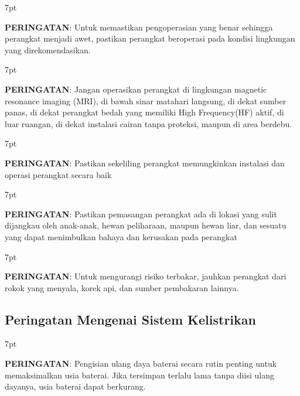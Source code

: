 \documentclass[11pt,a4paper,twoside,draft,onecolumn]{book}
\newenvironment{formalred}{%
	\def\FrameCommand{%
		\hspace{1pt}%
		{\color{red}\vrule width 2pt}%
		{\color{formalshade}\vrule width 4pt}%
		\colorbox{formalshade}%
	}%
	\MakeFramed{\advance\hsize-\width\FrameRestore}%
	\noindent\hspace{-4.55pt}%
	\begin{adjustwidth}{}{7pt}%
		\vspace{2pt}\vspace{2pt}%
	}
	{%
		\vspace{2pt}\end{adjustwidth}\endMakeFramed%
}
\begin{document}
				\begin{formalred}
					\raisebox{0.125ex}{\resizebox{!}{2ex}{\danger}} \textbf{PERINGATAN}: 
					Untuk memastikan pengoperasian yang benar sehingga perangkat menjadi awet, pastikan perangkat beroperasi pada kondisi lingkungan yang direkomendasikan.
				\end{formalred}
			
				\begin{formalred}
					\raisebox{0.125ex}{\resizebox{!}{2ex}{\danger}} \textbf{PERINGATAN}: 
					Jangan operasikan perangkat di lingkungan magnetic resonance imaging (MRI), di bawah sinar matahari langsung, di dekat sumber panas, di dekat perangkat bedah yang memiliki High Frequency(HF) aktif, di luar ruangan, di dekat instalasi cairan tanpa proteksi, maupun di area berdebu.
				\end{formalred}
			
				\begin{formalred}
					\raisebox{0.125ex}{\resizebox{!}{2ex}{\danger}} \textbf{PERINGATAN}: 
					Pastikan sekeliling perangkat memungkinkan instalasi dan operasi perangkat secara baik
				\end{formalred}
			
				\begin{formalred}
					\raisebox{0.125ex}{\resizebox{!}{2ex}{\danger}} \textbf{PERINGATAN}: 
					Pastikan pemasangan perangkat ada di lokasi yang sulit dijangkau oleh anak-anak, hewan peliharaan, maupun hewan liar, dan sesuatu yang dapat menimbulkan bahaya dan kerusakan pada perangkat
				\end{formalred}
			
				\begin{formalred}
					\raisebox{0.125ex}{\resizebox{!}{2ex}{\danger}} \textbf{PERINGATAN}: 
					Untuk mengurangi risiko terbakar, jauhkan perangkat dari rokok yang menyala, korek api, dan sumber pembakaran lainnya.
				\end{formalred}			
				
			\subsection{Peringatan Mengenai Sistem Kelistrikan}
				\begin{formalred}
					\raisebox{0.125ex}{\resizebox{!}{2ex}{\danger}} \textbf{PERINGATAN}: 
					Pengisian ulang daya baterai secara rutin penting untuk memaksimalkan usia baterai. Jika tersimpan terlalu lama tanpa diisi ulang dayanya, usia baterai dapat berkurang.
				\end{formalred}
				
\end{document}
